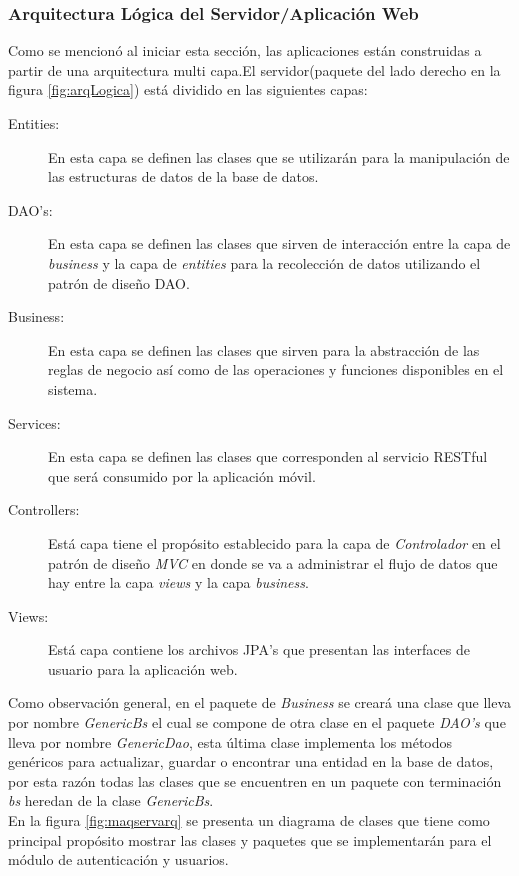 \subsubsection{Arquitectura Lógica del Servidor/Aplicación Web}
Como se mencionó al iniciar esta sección, las aplicaciones están construidas a partir de una arquitectura multi capa.El servidor(paquete del lado derecho en la figura \ref{fig:arqLogica}) está dividido en las siguientes capas:
	\begin{description}
		\item[Entities:] En esta capa se definen las clases que se utilizarán para la manipulación de las estructuras de datos de la base de datos.
		\item[DAO's:] En esta capa se definen las clases que sirven de interacción entre la capa de \textit{business} y la capa de \textit{entities} para la recolección de datos utilizando el patrón de diseño DAO.
		\item[Business:] En esta capa se definen las clases que sirven para la abstracción de las reglas de negocio así como de las operaciones y funciones disponibles en el sistema.
		\item[Services:] En esta capa se definen las clases que corresponden al servicio RESTful que será consumido por la aplicación móvil.
		\item[Controllers:] Está capa tiene el propósito establecido para la capa de \textit{Controlador} en el patrón de diseño \textit{MVC} en donde se va a administrar el flujo de datos que hay entre la capa \textit{views} y la capa \textit{business}.
		\item[Views:] Está capa contiene los archivos JPA's que presentan las interfaces de usuario para la aplicación web.
	\end{description}
	
Como observación general, en el paquete de \textit{Business} se creará una clase que lleva por nombre \textit{GenericBs} el cual se compone de otra clase en el paquete \textit{DAO's} que lleva por nombre \textit{GenericDao}, esta última clase implementa los métodos genéricos para actualizar, guardar o encontrar una entidad en la base de datos, por esta razón todas las clases que se encuentren en un paquete con terminación \textit{bs} heredan de la clase \textit{GenericBs}.\\
	
En la figura \ref{fig:maqservarq} se presenta un diagrama de clases que tiene como principal propósito mostrar las clases y paquetes que se implementarán para el módulo de autenticación y usuarios.


